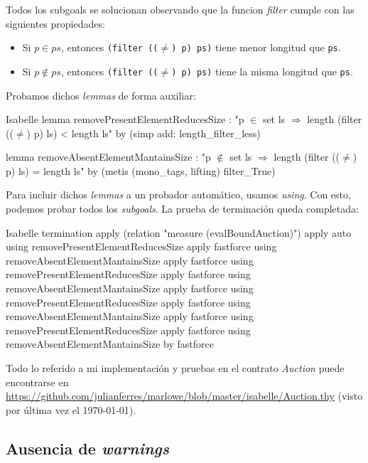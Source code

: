 \documentclass[12pt]{book}
\begin{document}
Todos los subgoals se solucionan observando que la funcion \textit{filter} cumple con las siguientes propiedades:

\begin{itemize}
    \item Si $p \in ps$, entonces \texttt{(filter (($\neq$) p) ps)} tiene menor longitud que \texttt{ps}. 
    \item Si $p \notin ps$, entonces \texttt{(filter (($\neq$) p) ps)} tiene la misma longitud que \texttt{ps}. 
\end{itemize}

Probamos dichos \textit{lemmas} de forma auxiliar:

\begin{code}[title=Lemas auxiliares sobre \textit{filter} utilizados para la prueba de terminación.]{Isabelle}
lemma removePresentElementReducesSize :
    "p $\in$ set ls $\Rightarrow$ length (filter (($\neq$) p) ls) < length ls"
  by (simp add: length_filter_less)

lemma removeAbsentElementMantainsSize : 
    "p $\notin$ set ls $\Rightarrow$ length (filter (($\neq$) p) ls) = length ls"
  by (metis (mono_tags, lifting) filter_True)
\end{code}


Para incluir dichos \textit{lemmas} a un probador automático, usamos \textit{using}. Con esto, podemos probar todos los \textit{subgoals}. La prueba de terminación queda completada:

\begin{code}[title=Prueba de terminación de \textit{contractLoop} y sus funciones recursivas.]{Isabelle}
termination 
  apply (relation "measure (evalBoundAuction)")
  apply auto 
  using removePresentElementReducesSize apply fastforce
  using removeAbsentElementMantainsSize apply fastforce
  using removePresentElementReducesSize apply fastforce
  using removeAbsentElementMantainsSize apply fastforce
  using removePresentElementReducesSize apply fastforce
  using removeAbsentElementMantainsSize apply fastforce
  using removePresentElementReducesSize apply fastforce
  using removeAbsentElementMantainsSize by fastforce
\end{code}

Todo lo referido a mi implementación y pruebas en el contrato \textit{Auction} puede encontrarse en \url{https://github.com/julianferres/marlowe/blob/master/isabelle/Auction.thy} (visto por última vez el \today).


\subsection{Ausencia de \textit{warnings}}
\end{document}
